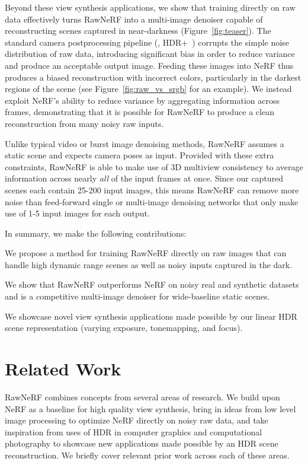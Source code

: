 Beyond these view synthesis applications, we show that training directly on raw data effectively turns RawNeRF into
a multi-image denoiser capable of reconstructing scenes captured in near-darkness (Figure~\ref{fig:teaser}). 
The standard camera postprocessing pipeline (\eg, HDR+~\cite{hdrplus}) corrupts the simple noise distribution of raw data, introducing significant bias in order to reduce variance and produce an acceptable output image. 
Feeding these images into NeRF thus produces a biased reconstruction with incorrect colors, particularly in the darkest regions of the scene (see Figure~\ref{fig:raw_vs_srgb} for an example). 
We instead exploit NeRF's ability to reduce variance by aggregating information across frames, demonstrating that it is possible for RawNeRF to produce a clean reconstruction from many noisy raw inputs. 

Unlike typical video or burst image denoising methods, RawNeRF assumes a static scene and expects camera poses as input. Provided with these extra constraints, RawNeRF is able to make use of 3D multiview consistency to average information across nearly \emph{all} of the input frames at once. Since our captured scenes each contain 25-200 input images, this means RawNeRF can remove more noise than feed-forward single or multi-image denoising networks that only make use of 1-5 input images for each output. 

In summary, we make the following contributions:
\begin{compactenum}
    \item We propose a method for training RawNeRF directly on raw images
    that can handle high dynamic range scenes as well as noisy inputs captured in the dark.
    \item We show that RawNeRF outperforms NeRF on noisy real and synthetic datasets and is a competitive multi-image denoiser for wide-baseline static scenes.
    \item We showcase novel view synthesis applications made possible by our linear HDR scene representation (varying exposure, tonemapping, and focus).
\end{compactenum}




\section{Related Work}
\label{sec:relatedwork}

RawNeRF combines concepts from several areas of research. We build upon NeRF as a baseline for high quality view synthesis, bring in ideas from low level image processing to optimize NeRF directly on noisy raw data, and take inspiration from uses of HDR in computer graphics and computational photography to showcase new applications made possible by an HDR scene reconstruction. We briefly cover relevant prior work across each of these areas.


